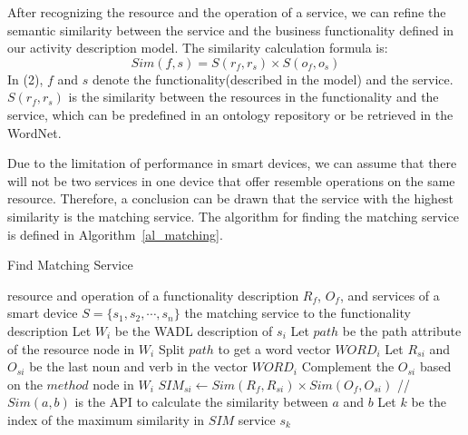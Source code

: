 After recognizing the resource and the operation of a service, we can refine the semantic similarity between the service and the business functionality defined in our activity description model. The similarity calculation formula is:
\begin{equation}
	Sim(f,s) = S(r_f,r_s) \times S(o_f,o_s)
\end{equation}
In (2), $f$ and $s$ denote the functionality(described in the model) and the service. $S(r_f,r_s)$ is the similarity between the resources in the functionality and the service, which can be predefined in an ontology repository or be retrieved in the WordNet\cite{wordnet}. 

Due to the limitation of performance in smart devices, we can assume that there will not be two services in one device that offer resemble operations on the same resource. Therefore, a conclusion can be drawn that the service with the highest similarity is the matching service. The algorithm for finding the matching service is defined in Algorithm~\ref{al_matching}. 
 \begin{algorithm}
        \caption{Find Matching Service}
        \begin{algorithmic}[1] 
            \Require resource and operation of a functionality description $R_f$, $O_f$, and services of a smart device $S = \{ s_1, s_2,\cdots,s_n\}$
            \Ensure the matching service to the functionality description
                   	   \State Let $W_i$ be the WADL description of $s_i$
  					   \State Let $path$ be the path attribute of the resource node in $W_i$
  					   \State Split $path$ to get a word vector $WORD_i$
  					   \State Let $R_{si}$ and $O_{si}$ be the last noun and verb in the vector $WORD_i$
  					   		\State Complement the $O_{si}$ based on the $method$ node in $W_i$
  					   \EndIf
  					   \State $SIM_{si} \leftarrow Sim(R_f,R_{si}) \times Sim(O_f,O_{si})$ //$Sim(a,b)$ is the API to calculate the similarity between $a$ and $b$
				   \EndFor
				   \State Let $k$ be the index of the maximum similarity in $SIM$
				   \State\Return service $s_k$ 
        \end{algorithmic}
        \label{al_matching}
 \end{algorithm}
 
